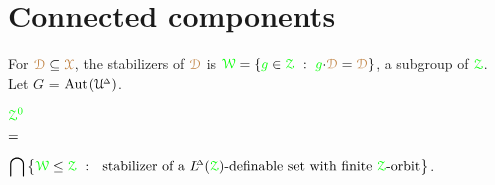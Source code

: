 \begin{comment}
\begin{proof}
  Assume inductively that $\mrD\cap{\gr g'}{\cdot}\mrD$ is $H$-wide, where ${\gr g'}\in\<\,({\gr g})_{K}^2\>$.
  Pick two arbitrary ${\gr a},{\gr b}\in({\gr g})_K$.
  We claim that $\mrD\cap{\gr a}{\cdot}{\gr b}{\cdot}{\gr g'}{\cdot}\mrD$ is $H$-wide.
  From the induction hypothesis it follows that ${\gr b}{\cdot}\mrD\cap{\gr b}{\cdot}{\gr g'}{\cdot}\mrD$ is $H$-wide.
  By Fact~\ref{prop_wideHcojugate_symm}, ${\gr a^{-1}}{\cdot}\mrD\cap{\gr b}{\cdot}{\gr g'}{\cdot}\mrD$ is $H$-wide and the claim follows.
\end{proof}
\end{comment}

\section{Connected components}

\def\medrel#1{\parbox[t]{5ex}{$\displaystyle\hfil #1$}}
\def\ceq#1#2#3{\parbox[t]{5ex}{$\displaystyle #1$}\medrel{#2}{$\displaystyle #3$}}

For ${\color{brown}\EuScript D}\subseteq{\color{brown}\EuScript X}$, the stabilizers of ${\color{brown}\EuScript D}$ is ${\color{green}\EuScript W}=\{{\color{green} g}\in{\color{green}\EuScript Z}\ :\ {\color{green} g}{\cdot}{\color{brown}\EuScript D}={\color{brown}\EuScript D}\}$, a subgroup of $\grZ$.
Let \emph{$G$\/} = ${\rm Aut\kern.15ex}(\EuScript U\kern-.2ex^{\scriptscriptstyle\Delta})$.

\begin{definition}\label{def_G0}\noindent\vspace*{0.1ex}

  \ceq{\hfill{\gr\Z^0}}{=}{\bigcap\big\{\grW\le\grZ\ :\ \textrm{ stabilizer of a }\LDelta(\grZ)\textrm{-definable set with finite $\grZ$-orbit}\big\}}.\smallskip

\end{definition}





